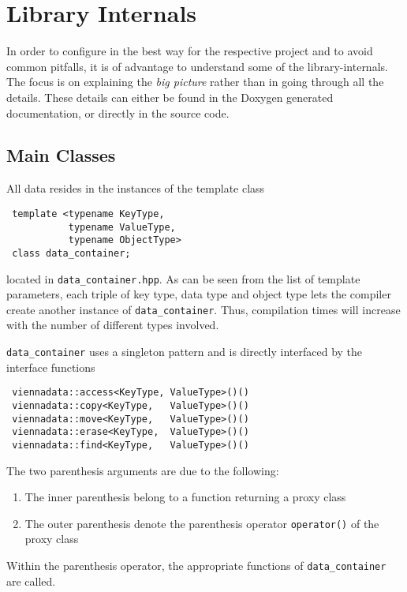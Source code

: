 \chapter{Library Internals} \label{chap:internals}
In order to configure {\ViennaData} in the best way for the respective project and to avoid common pitfalls,
it is of advantage to understand some of the library-internals.
The focus is on explaining the \emph{big picture} rather than in going through all the details.
These details can either be found in the Doxygen generated documentation, or directly in the source code.

\section{Main Classes}
All data resides in the instances of the template class
\begin{lstlisting}
 template <typename KeyType,
           typename ValueType,
           typename ObjectType>
 class data_container;
\end{lstlisting}
located in \lstinline|data_container.hpp|.
As can be seen from the list of template parameters, each triple of key type, data type and object type lets
the compiler create another instance of \lstinline|data_container|. Thus, compilation times will increase with the number of different types involved.

\lstinline|data_container| uses a singleton pattern and is directly interfaced by the interface functions
\begin{lstlisting}
 viennadata::access<KeyType, ValueType>()()
 viennadata::copy<KeyType,   ValueType>()()
 viennadata::move<KeyType,   ValueType>()()
 viennadata::erase<KeyType,  ValueType>()()
 viennadata::find<KeyType,   ValueType>()()
\end{lstlisting}
The two parenthesis arguments are due to the following:
\begin{enumerate}
 \item The inner parenthesis belong to a function returning a proxy class
 \item The outer parenthesis denote the parenthesis operator \lstinline|operator()| of the proxy class
\end{enumerate}
Within the parenthesis operator, the appropriate functions of \lstinline|data_container| are called.

